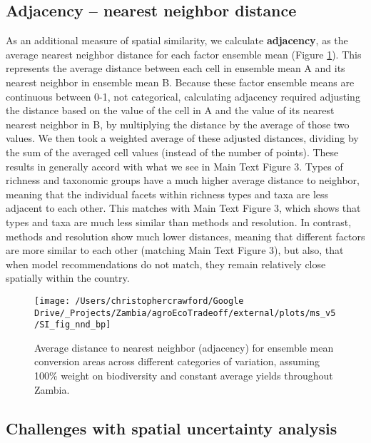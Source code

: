 \documentclass[
]{article}
\begin{document}
\newpage

\hypertarget{section-adjacency}{%
\subsection{Adjacency -- nearest neighbor distance}\label{section-adjacency}}

As an additional measure of spatial similarity, we calculate \textbf{adjacency}, as the average nearest neighbor distance for each factor ensemble mean (Figure \ref{fig:nnd-fig}). This represents the average distance between each cell in ensemble mean A and its nearest neighbor in ensemble mean B. Because these factor ensemble means are continuous between 0-1, not categorical, calculating adjacency required adjusting the distance based on the value of the cell in A and the value of its nearest nearest neighbor in B, by multiplying the distance by the average of those two values. We then took a weighted average of these adjusted distances, dividing by the sum of the averaged cell values (instead of the number of points). These results in generally accord with what we see in Main Text Figure 3. Types of richness and taxonomic groups have a much higher average distance to neighbor, meaning that the individual facets within richness types and taxa are less adjacent to each other. This matches with Main Text Figure 3, which shows that types and taxa are much less similar than methods and resolution. In contrast, methods and resolution show much lower distances, meaning that different factors are more similar to each other (matching Main Text Figure 3), but also, that when model recommendations do not match, they remain relatively close spatially within the country.



\begin{figure}
\texttt{[image: /Users/christophercrawford/Google Drive/\_Projects/Zambia/agroEcoTradeoff/external/plots/ms\_v5/SI\_fig\_nnd\_bp]} \caption{Average distance to nearest neighbor (adjacency) for ensemble mean conversion areas across different categories of variation, assuming 100\% weight on biodiversity and constant average yields throughout Zambia.}\label{fig:nnd-fig}
\end{figure}

\hypertarget{challenges-with-spatial-uncertainty-analysis}{%
\subsection{Challenges with spatial uncertainty analysis}\label{challenges-with-spatial-uncertainty-analysis}}
\end{document}
